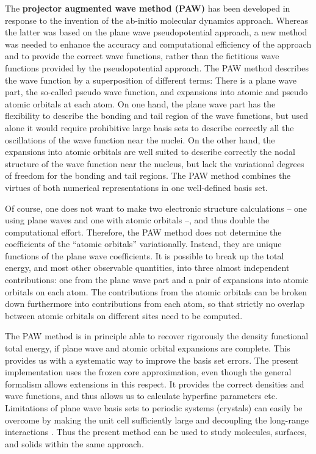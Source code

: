 \documentclass[final,12pt,makeidx,DIV=calc]{article}
\begin{document}
The {\bf projector augmented wave method (PAW)}
\cite{bloechl94_prb50_17953} has been developed in response to the
invention of the ab-initio molecular dynamics approach. Whereas the
latter was based on the plane wave pseudopotential approach, a new
method was needed to enhance the accuracy and computational efficiency
of the approach and to provide the correct wave functions, rather than
the fictitious wave functions provided by the pseudopotential
approach.  The PAW method describes the wave function by a
superposition of different terms: There is a plane wave part, the
so-called pseudo wave function, and expansions into atomic and pseudo
atomic orbitals at each atom. On one hand, the plane wave part has the
flexibility to describe the bonding and tail region of the wave
functions, but used alone it would require prohibitive large basis
sets to describe correctly all the oscillations of the wave function
near the nuclei. On the other hand, the expansions into atomic
orbitals are well suited to describe correctly the nodal structure of
the wave function near the nucleus, but lack the variational degrees
of freedom for the bonding and tail regions.  The PAW method combines
the virtues of both numerical representations in one well-defined
basis set.

Of course, one does not want to make two electronic structure
calculations  -- one using plane waves and one with atomic
orbitals --, and thus double the computational effort. Therefore, the
PAW method does not determine the coefficients of the ``atomic orbitals''
variationally. Instead, they are unique functions of the plane wave
coefficients. It is possible to break up the total energy, and most
other observable quantities, into three almost independent
contributions: one from the plane wave part and a pair of expansions
into atomic orbitals on each atom. The contributions from the atomic
orbitals can be broken down furthermore into contributions from each atom,
so that strictly no overlap between atomic orbitals on different sites
need to be computed.

The PAW method is in principle able to recover rigorously the density
functional total energy, if plane wave and atomic orbital expansions are
complete. This provides us with a systematic way to improve the basis set
errors.  The present implementation uses the frozen core approximation, even
though the general formalism allows extensions in this respect. It provides
the correct densities and wave functions, and thus allows us to calculate
hyperfine parameters etc.  Limitations of plane wave basis sets to periodic
systems (crystals) can easily be overcome by making the unit cell sufficiently
large and decoupling the long-range interactions
\cite{bloechl95_jcp103_7422}. Thus the present method can be used to study
molecules, surfaces, and solids within the same approach.
\end{document}
